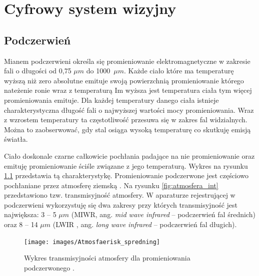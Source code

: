 \chapter{Cyfrowy system wizyjny}
\label{cha:csw}



\section{Podczerwień}

Mianem podczerwieni określa się promieniowanie elektromagnetyczne w zakresie fali o długości od 0,75 $\mu m$ do 1000~$\mu m$.
Każde ciało które ma temperaturę wyższą niż zero absolutne emituje swoją powierzchnią promieniowanie którego nateżenie ronie wraz z temperaturą
Im wyższa jest temperatura ciała tym więcej promieniowania emituje. %
Dla każdej temperatury danego ciała istnieje charakterystyczna długość fali o najwyższej wartości mocy promieniowania. 
Wraz z wzrostem temperatury ta częstotliwość przesuwa się w zakres fal widzialnych. 
Można to zaobserwować, gdy stal osiąga wysoką temperaturę co skutkuję emisją światła. 

Ciało doskonale czarne całkowicie pochłania padające na nie promieniowanie oraz emituję promieniowanie ściśle związane z jego temperaturą. 
Wykres na rysunku \ref{fig:perfect_black} przedstawia tą charakterystykę. 
Promieniowanie podczerwone jest częściowo pochłaniane przez atmosferę ziemską . 
Na rysunku \ref{fig:atmosfera_int} przedstawiono  tzw. transmisyjność atmosfery. 
W aparaturze rejestrującej w podczerwieni wykorzystuję się dwa zakresy przy których transmisyjność jest największa: 3 -- 5 $\mu m$ (MIWR, ang. \textit{mid wave infrared} -- podczerwień fal średnich) oraz 8 -- 14 $\mu m$ (LWIR , ang. \textit{long wave infrared} -- podczerwień fal długich)\cite{niklaus2007mems}.

\begin{figure}
\centering
\texttt{[image: images/Atmosfaerisk\_spredning]}
\caption[Wykres transmisyjności atmosfery dla promieniowania podczerwonego ]{Wykres transmisyjności atmosfery dla promieniowania podczerwonego \cite{wiki:infrared}.}
\label{fig:perfect_black}
\end{figure}

